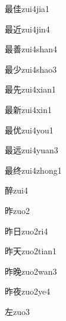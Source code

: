 \begin{verbete}[12;8]{最佳}{zui4jia1}
\end{verbete}
\begin{verbete}[12;7]{最近}{zui4jin4}
\end{verbete}
\begin{verbete}[12;12]{最善}{zui4shan4}
\end{verbete}
\begin{verbete}[12;4]{最少}{zui4shao3}
\end{verbete}
\begin{verbete}[12;6]{最先}{zui4xian1}
\end{verbete}
\begin{verbete}[12;13]{最新}{zui4xin1}
\end{verbete}
\begin{verbete}[12;6]{最优}{zui4you1}
\end{verbete}
\begin{verbete}[12;7]{最远}{zui4yuan3}
\end{verbete}
\begin{verbete}[12;8]{最终}{zui4zhong1}
\end{verbete}
\begin{verbete}[15]{醉}{zui4}
\end{verbete}
\begin{verbete}[9]{昨}{zuo2}
\end{verbete}
\begin{verbete}[9;4]{昨日}{zuo2ri4}
\end{verbete}
\begin{verbete}[9;4]{昨天}{zuo2tian1}
\end{verbete}
\begin{verbete}[9;11]{昨晚}{zuo2wan3}
\end{verbete}
\begin{verbete}[9;8]{昨夜}{zuo2ye4}
\end{verbete}
\begin{verbete}[5]{左}{zuo3}
\end{verbete}
